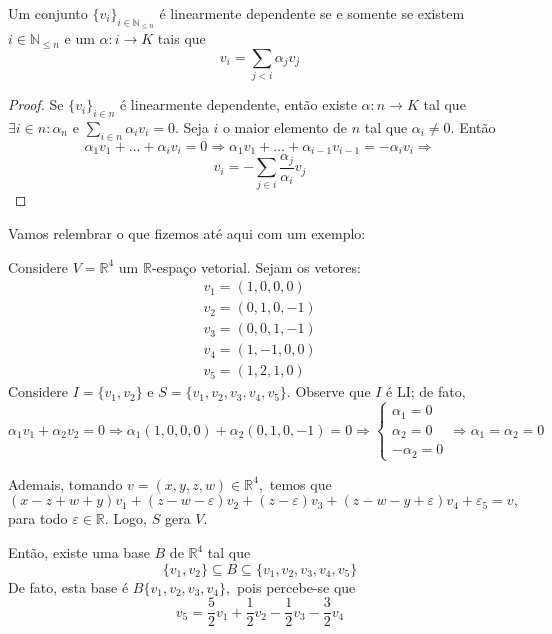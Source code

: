 \documentclass[11pt,twoside,a4paper]{book}
\begin{document}
\begin{sublema}
Um conjunto $\{v_i\}_{i \in \mathbb{N}_{\le n}}$ é linearmente dependente se e somente se existem $i\in  \mathbb{N}_{\le n}$ e um $\alpha: i\rightarrow K$ tais que \[v_i=\sum\limits_{j <i}\alpha_jv_j\]
\begin{proof}
Se $\{v_i\}_{i\in n}$ é linearmente dependente, então existe $\alpha:n\rightarrow K$ tal que $\exists i\in n:\alpha_n$ e $\sum_{i\in n}\alpha_iv_i=0$. Seja $i$ o maior elemento de $n$ tal que $\alpha_i\neq 0$. Então 
\[
\alpha_1 v_1 + \ldots + \alpha_i v_i = 0 \Rightarrow \alpha_1v_1 + \ldots + \alpha_{i-1} v_{i-1} = - \alpha_i v_i \Rightarrow
\]
\[v_i= - \sum\limits_{j\in i}\frac{\alpha_j}{\alpha_i}v_j\]
\end{proof}
\end{sublema}

Vamos relembrar o que fizemos até aqui com um exemplo:
\begin{exemplo}
Considere $V = \mathbb{R}^4$ um $\mathbb{R}$-espaço vetorial. Sejam os vetores:
\[
\begin{array}{l}
v_1 = (1,0,0,0) \\
v_2 = (0,1,0,-1) \\
v_3 = (0,0,1,-1) \\
v_4 = (1,-1,0,0) \\
v_5 = (1,2,1,0) 
\end{array}
\]
Considere $I = \{ v_1, v_2 \}$ e $S  =\{ v_1,v_2,v_3,v_4,v_5 \}.$ Observe que $I$ é LI; de fato,
\[
\alpha_1v_1 + \alpha_2v_2 = 0 \Rightarrow \alpha_1(1,0,0,0) + \alpha_2 (0,1,0,-1) = 0 \Rightarrow \left\{ \begin{array}{l} \alpha_1 = 0 \\ \alpha_2 = 0 \\ - \alpha_2 = 0 \end{array} \right. \Rightarrow \alpha_1 = \alpha_2 = 0
\]

Ademais, tomando $v = (x,y,z,w) \in \mathbb{R}^4,$ temos que
\[
(x-z+w+y)v_1 + (z- w - \varepsilon)v_2 + (z - \varepsilon)v_3 + (z-w-y + \varepsilon)v_4 + \varepsilon_5 = v,
\]
para todo $\varepsilon \in \mathbb{R}.$ Logo, $S$ gera $V.$ 

Então, existe uma base $B$ de $\mathbb{R}^4$ tal que 
\[
\{ v_1, v_2 \} \subseteq B \subseteq \{v_1,v_2,v_3,v_4,v_5 \}
\]
De fato, esta base é $B \{v_1, v_2, v_3, v_4 \},$ pois percebe-se que
\[
v_5 = \frac{5}{2}v_1 + \frac{1}{2} v_2 - \frac{1}{2}v_3 - \frac{3}{2} v_4
\]
\end{exemplo}
\end{document}
